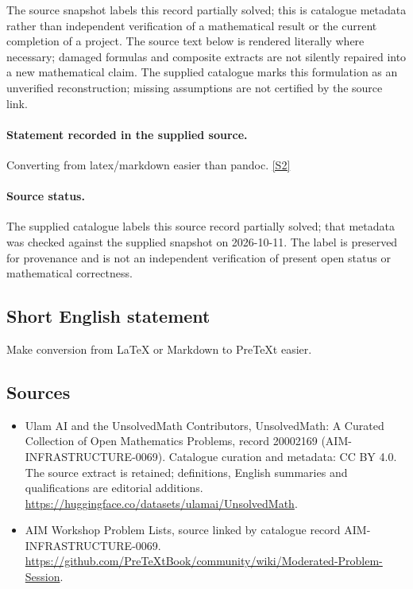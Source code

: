 \documentclass[11pt]{article}
\begin{document}
The source snapshot labels this record partially solved; this is catalogue metadata rather than independent verification of a mathematical result or the current completion of a project.
The source text below is rendered literally where necessary; damaged formulas and composite extracts are not silently repaired into a new mathematical claim.
The supplied catalogue marks this formulation as an unverified reconstruction; missing assumptions are not certified by the source link.
\paragraph{Statement recorded in the supplied source.}
Converting from latex/markdown easier than pandoc. \href{https://github.com/PreTeXtBook/community/wiki/Moderated-Problem-Session}{[S2]}
\paragraph{Source status.}
The supplied catalogue labels this source record partially solved; that metadata was checked against the supplied snapshot on 2026-10-11. The label is preserved for provenance and is not an independent verification of present open status or mathematical correctness.
\subsection{Short English statement}
Make conversion from LaTeX or Markdown to PreTeXt easier.
\subsection{Sources}
\begin{itemize}
\item[S1] Ulam AI and the UnsolvedMath Contributors, UnsolvedMath: A Curated Collection of Open Mathematics Problems, record 20002169 (AIM-INFRASTRUCTURE-0069). Catalogue curation and metadata: CC BY 4.0. The source extract is retained; definitions, English summaries and qualifications are editorial additions.
\url{https://huggingface.co/datasets/ulamai/UnsolvedMath}.
\item[S2] AIM Workshop Problem Lists, source linked by catalogue record AIM-INFRASTRUCTURE-0069.
\url{https://github.com/PreTeXtBook/community/wiki/Moderated-Problem-Session}.
\end{itemize}
\end{document}
